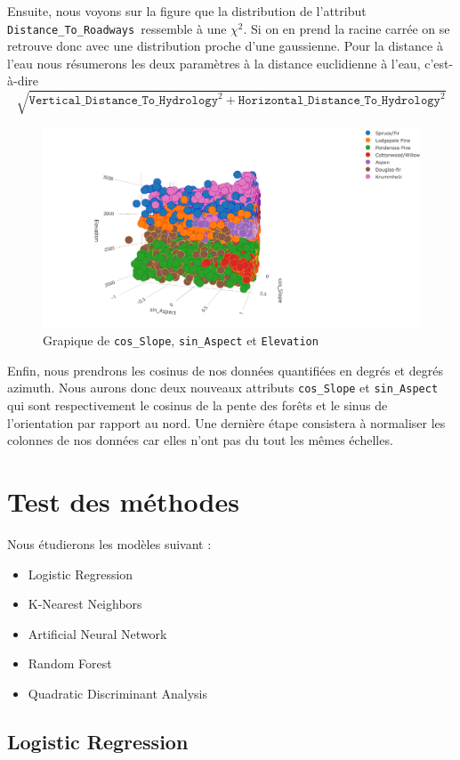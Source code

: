\documentclass[12pt,a4paper]{article}
\numberwithin{equation}{section}
\newcommand{\elevation}{\texttt{Elevation}}
\newcommand{\hhydro}{\texttt{Horizontal\_Distance\_To\_Hydrology}}
\newcommand{\vhydro}{\texttt{Vertical\_Distance\_To\_Hydrology}}
\newcommand{\roadways}{\texttt{Distance\_To\_Roadways}}
\begin{document}
	Ensuite, nous voyons sur la figure que la distribution de l'attribut \roadways \ ressemble à une $\chi^2$. Si on en prend la racine carrée on se retrouve donc avec une distribution proche d'une gaussienne. Pour la distance à l'eau nous résumerons les deux paramètres à la distance euclidienne à l'eau, c'est-à-dire $$ \sqrt{\vhydro^2 + \hhydro^2}$$
	
	\begin{figure}[h]
		\centering
		\includegraphics[width=.8\linewidth]{img/sin_aspect}
		\caption{Grapique de \texttt{cos\_Slope}, \texttt{sin\_Aspect} et \elevation}
	\end{figure}
	
	Enfin, nous prendrons les cosinus de nos données quantifiées en degrés et degrés azimuth. Nous aurons donc deux nouveaux attributs \texttt{cos\_Slope} et \texttt{sin\_Aspect} qui sont respectivement le cosinus de la pente des forêts et le sinus de l'orientation par rapport au nord. Une dernière étape consistera à normaliser les colonnes de nos données car elles n'ont pas du tout les mêmes échelles.\\
	
	\section{Test des méthodes}
	
	Nous étudierons les modèles suivant : 
	
	\begin{itemize}
		\item Logistic Regression
		\item K-Nearest Neighbors
		\item Artificial Neural Network
		\item Random Forest
		\item Quadratic Discriminant Analysis
	\end{itemize}
	
	\subsection{Logistic Regression}
	
\end{document}
